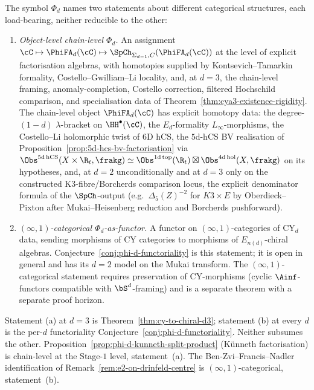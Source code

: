 \begin{remark}
\label{rem:phi-d-chain-vs-inf1-functor}
The symbol $\Phi_d$ names two statements about different categorical structures, each load-bearing, neither reducible to the other:
\begin{enumerate}[label=\textup{(\alph*)}]
 \item \emph{Object-level chain-level $\Phi_d$.} An assignment $\cC \mapsto \PhiFA_d(\cC) \mapsto \SpCh_{\Sigma_{d-1}, C}(\PhiFA_d(\cC))$ at the level of explicit factorisation algebras, with homotopies supplied by Kontsevich--Tamarkin formality, Costello--Gwilliam--Li locality, and, at $d = 3$, the chain-level framing, anomaly-completion, Costello correction, filtered Hochschild comparison, and specialisation data of Theorem~\ref{thm:cya3-existence-rigidity}. The chain-level object $\PhiFA_d(\cC)$ has explicit homotopy data: the degree-$(1-d)$ $\lambda$-bracket on $\HH^\bullet(\cC)$, the $E_d$-formality $L_\infty$-morphisms, the Costello--Li holomorphic twist of 6D hCS, the $5$d-hCS BV realisation of Proposition~\ref{prop:5d-hcs-bv-factorisation} via $\Obs^{5\mathrm{d\,hCS}}(X \times \R_t, \frakg) \simeq \Obs^{1\mathrm{d\,top}}(\R_t) \boxtimes \Obs^{4\mathrm{d\,hol}}(X, \frakg)$ on its hypotheses, and, at $d = 2$ unconditionally and at $d = 3$ only on the constructed K3-fibre/Borcherds comparison locus, the explicit denominator formula of the $\SpCh$-output (e.g.\ $\Delta_5(Z)^{-2}$ for $K3 \times E$ by Oberdieck--Pixton after Mukai--Heisenberg reduction and Borcherds pushforward).
 \item \emph{$(\infty,1)$-categorical $\Phi_d$-as-functor.} A functor on $(\infty,1)$-categories of CY$_d$ data, sending morphisms of CY categories to morphisms of $E_{n(d)}$-chiral algebras. Conjecture~\ref{conj:phi-d-functoriality} is this statement; it is open in general and has its \(d=2\) model on the Mukai transform. The $(\infty,1)$-categorical statement requires preservation of CY-morphisms (cyclic $\Ainf$-functors compatible with $\bS^d$-framing) and is a separate theorem with a separate proof horizon.
\end{enumerate}
Statement \textup{(a)} at $d = 3$ is Theorem~\ref{thm:cy-to-chiral-d3}; statement \textup{(b)} at every $d$ is the per-$d$ functoriality Conjecture~\ref{conj:phi-d-functoriality}. Neither subsumes the other. Proposition~\ref{prop:phi-d-kunneth-split-product} \textup{(}K\"unneth factorisation\textup{)} is chain-level at the Stage-$1$ level, statement~\textup{(a)}. The Ben-Zvi--Francis--Nadler identification of Remark~\ref{rem:e2-on-drinfeld-centre} is $(\infty,1)$-categorical, statement~\textup{(b)}.
\end{remark}

